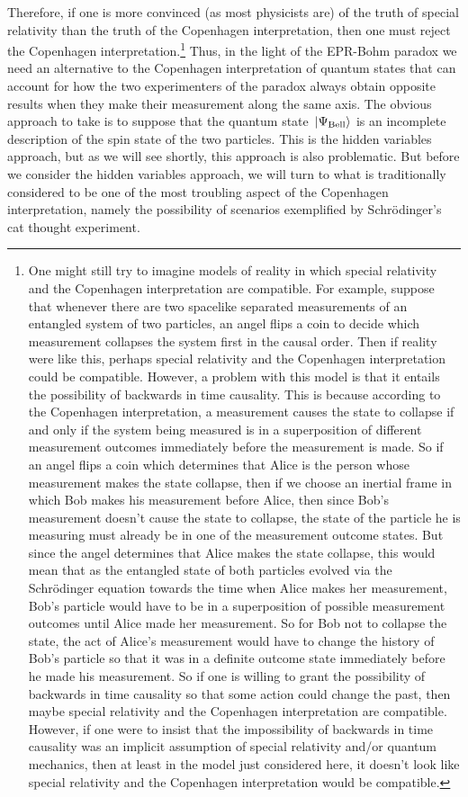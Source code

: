 Therefore, if one is more convinced (as most physicists are) of the truth of special relativity than the truth of the Copenhagen interpretation, then one must reject the Copenhagen interpretation.\footnote{One might still try to imagine models of reality in which special relativity and the Copenhagen interpretation are compatible. For example, suppose that whenever there are two spacelike separated measurements of an entangled system of two particles, an angel flips a coin to decide which measurement collapses the system first in the causal order. Then if reality were like this, perhaps special relativity and the Copenhagen interpretation could be compatible. However, a problem with this model is that it entails the possibility of backwards in time causality. This is because according to the Copenhagen interpretation, a measurement causes the state to collapse if and only if the system being measured is in a superposition of different measurement outcomes immediately before the measurement is made. So if an angel flips a coin which determines that Alice is the person whose measurement makes the state collapse, then if we choose an inertial frame in which Bob makes his measurement before Alice, then since Bob's measurement doesn't cause the state to collapse, the state of the particle he is measuring must already be in one of the measurement outcome states. But since the angel determines that Alice makes the state collapse, this would mean that as the entangled state of both particles evolved via the Schr\"{o}dinger equation towards the time when Alice makes her measurement, Bob's particle would have to be in a superposition of possible measurement outcomes until Alice made her measurement. So for Bob not to collapse the state, the act of Alice’s measurement would have to change the history of Bob's particle so that it was in a definite outcome state immediately before he made his measurement. So if one is willing to grant the possibility of backwards in time causality so that some action could change the past, then maybe special relativity and the Copenhagen interpretation are compatible. However, if one were to insist that the impossibility of backwards in time causality was an implicit assumption of special relativity and/or quantum mechanics, then at least in the model just considered here, it doesn’t look like special relativity and the Copenhagen interpretation would be compatible.} Thus, in the light of the EPR-Bohm paradox we need an alternative to the Copenhagen interpretation of quantum states that can account for how the two experimenters of the paradox always obtain opposite results when they make their measurement along the same axis. The obvious approach to take is to suppose that the quantum state $\ket*{\Psi_{\text{Bell}}}$ is an incomplete description of the spin state of the two particles. This is the hidden variables approach, but as we will see shortly, this approach is also problematic. But before we consider the hidden variables approach, we will turn to what is traditionally considered to be one of the most troubling aspect of the Copenhagen interpretation, namely the possibility of scenarios exemplified by Schr\"{o}dinger's cat thought experiment.
